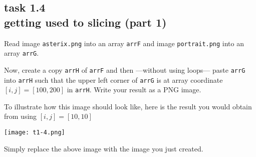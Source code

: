 
\subsection*{task 1.4 \\[1ex] getting used to slicing (part 1)}

Read image \texttt{asterix.png} into an array \texttt{arrF} and image \texttt{portrait.png} into an array \texttt{arrG}.

Now, create a copy \texttt{arrH} of \texttt{arrF} and then ---without using  loops--- paste \texttt{arrG} into \texttt{arrH} such that the upper left corner of \texttt{arrG} is at array coordinate $[i,j] = [100, 200]$ in \texttt{arrH}. Write your result as a PNG image.

To illustrate how this image should look like, here is the result you would obtain from using $[i,j] = [10, 10]$
\begin{center}
\texttt{[image: t1-4.png]} 
\end{center}
Simply replace the above image with the image you just created.






